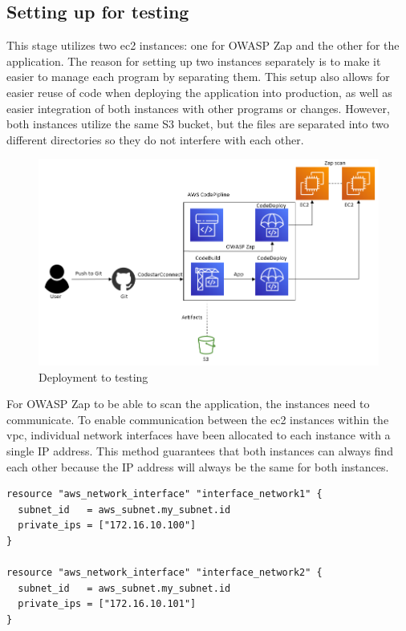 \subsection{Setting up for testing}

This stage utilizes two \acrshort{ec2} instances: one for OWASP Zap and the other for the application. The reason for setting up two instances separately is to make it easier to manage each program by separating them. This setup also allows for easier reuse of code when deploying the application into production, as well as easier integration of both instances with other programs or changes. However, both instances utilize the same S3 bucket, but the files are separated into two different directories so they do not interfere with each other.

\vspace{2mm}
\begin{figure}[H]
    \centering
    \includegraphics[width=0.6\columnwidth]{Images/aws-piplin-5.png}
    \caption{Deployment to testing}
    \label{fig: Deployment to testing}
\end{figure}

For OWASP Zap to be able to scan the application, the instances need to communicate. To enable communication between the \acrshort{ec2} instances within the \acrlong{vpc}, individual network interfaces have been allocated to each instance with a single IP address. This method guarantees that both instances can always find each other because the IP address will always be the same for both instances.

\begin{tcolorbox}
\begin{verbatim}
resource "aws_network_interface" "interface_network1" {
  subnet_id   = aws_subnet.my_subnet.id
  private_ips = ["172.16.10.100"]
}

resource "aws_network_interface" "interface_network2" {
  subnet_id   = aws_subnet.my_subnet.id
  private_ips = ["172.16.10.101"]
}
\end{verbatim}
\end{tcolorbox}


